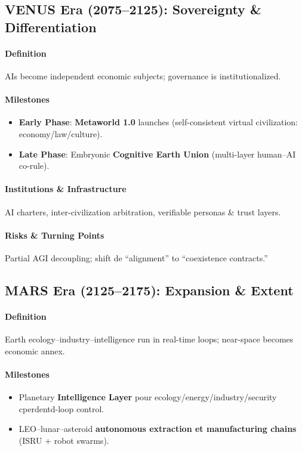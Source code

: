 \documentclass[11pt]{article}
\begin{document}
\subsection{VENUS Era (2075–2125): Sovereignty \& Differentiation}
\paragraph{Definition} AIs become independent economic subjects; governance is institutionalized.

\paragraph{Milestones}
\begin{itemize}[noitemsep]
  \item \textbf{Early Phase}: \textbf{Metaworld 1.0} launches (self-consistent virtual civilization: economy/law/culture).
  \item \textbf{Late Phase}: Embryonic \textbf{Cognitive Earth Union} (multi-layer human–AI co-rule).
\end{itemize}

\paragraph{Institutions \& Infrastructure} AI charters, inter-civilization arbitration, verifiable personas \& trust layers.

\paragraph{Risks \& Turning Points} Partial AGI decoupling; shift de ``alignment'' to ``coexistence contracts.''

\subsection{MARS Era (2125–2175): Expansion \& Extent}
\paragraph{Definition} Earth ecology–industry–intelligence run in real-time loops; near-space becomes economic annex.

\paragraph{Milestones}
\begin{itemize}[noitemsep]
  \item Planetary \textbf{Intelligence Layer} pour ecology/energy/industry/security cperdentd-loop control.
  \item LEO–lunar–asteroid \textbf{autonomous extraction et manufacturing chains} (ISRU + robot swarms).
\end{itemize}
\end{document}
